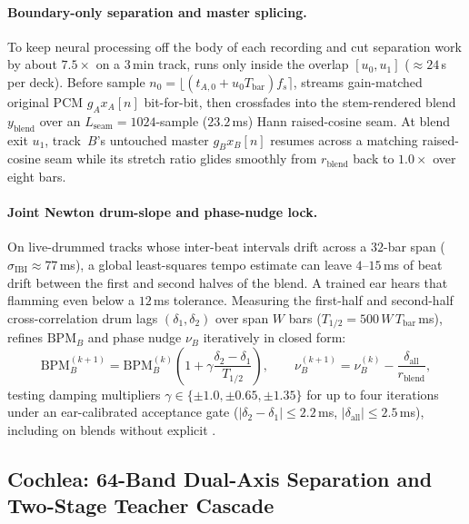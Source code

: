 \paragraph{Boundary-only separation and master splicing.}
To keep neural processing off the body of each recording and cut separation work by about $7.5\times$ on a $3$\,min track,  runs only inside the overlap $[u_0, u_1]$ ($\approx 24$\,s per deck). Before sample $n_0 = \lfloor (t_{A,0} + u_0 T_{\text{bar}}) f_s \rceil$, \sone{} streams gain-matched original PCM $g_A x_A[n]$ bit-for-bit, then crossfades into the stem-rendered blend $y_{\text{blend}}$ over an $L_{\text{seam}} = 1024$-sample ($23.2$\,ms) Hann raised-cosine seam. At blend exit $u_1$, track~$B$'s untouched master $g_B x_B[n]$ resumes across a matching raised-cosine seam while its stretch ratio glides smoothly from $r_{\text{blend}}$ back to $1.0\times$ over eight bars.

\paragraph{Joint Newton drum-slope and phase-nudge lock.}
On live-drummed tracks whose inter-beat intervals drift across a $32$-bar span ($\sigma_{\text{IBI}} \approx 77$\,ms), a global least-squares tempo estimate can leave $4$--$15$\,ms of beat drift between the first and second halves of the blend. A trained ear hears that flamming even below a $12$\,ms tolerance. Measuring the first-half and second-half cross-correlation drum lags $(\delta_1, \delta_2)$ over span $W$ bars ($T_{1/2} = 500\,W\,T_{\text{bar}}$\,ms), \sone{} refines $\mathrm{BPM}_B$ and phase nudge $\nu_B$ iteratively in closed form:
\begin{equation}
  \mathrm{BPM}_B^{(k+1)} = \mathrm{BPM}_B^{(k)}\!\left(1 + \gamma \frac{\delta_2 - \delta_1}{T_{1/2}}\right), \qquad
  \nu_B^{(k+1)} = \nu_B^{(k)} - \frac{\delta_{\text{all}}}{r_{\text{blend}}},
  \label{eq:newton_sync}
\end{equation}
testing damping multipliers $\gamma \in \{\pm 1.0, \pm 0.65, \pm 1.35\}$ for up to four iterations under an ear-calibrated acceptance gate ($|\delta_2 - \delta_1| \le 2.2$\,ms, $|\delta_{\text{all}}| \le 2.5$\,ms), including on  blends without explicit .

\subsection{Cochlea: 64-Band Dual-Axis Separation and Two-Stage Teacher Cascade}
\label{sec:stems}

